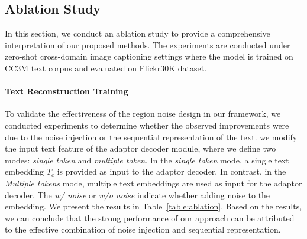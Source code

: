 \subsection{Ablation Study}
In this section, we conduct an ablation study to provide a comprehensive interpretation of our proposed methods. The experiments are conducted under zero-shot cross-domain image captioning settings where the model is trained on CC3M text corpus and evaluated on Flickr30K dataset.


\paragraph{\textbf{Text Reconstruction Training}}
To validate the effectiveness of the region noise design in our framework, we conducted experiments to determine whether the observed improvements were due to the noise injection or the sequential representation of the text. we modify the input text feature of the adaptor decoder module, where we define two modes: \textit{single token} and \textit{multiple token}. In the \textit{single token} mode, a single text embedding $T_c$ is provided as input to the adaptor decoder. In contrast, in the \textit{Multiple tokens} mode, multiple text embeddings are used as input for the adaptor decoder.
The \textit{w/ noise} or \textit{w/o noise} indicate whether adding noise to the embedding. We present the results in Table~\ref{table:ablation}. Based on the results, we can conclude that the strong performance of our approach can be attributed to the effective combination of noise injection and sequential representation.
